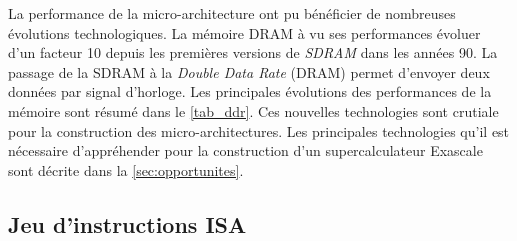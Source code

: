 La performance de la micro-architecture ont pu bénéficier de nombreuses évolutions technologiques.
La mémoire DRAM à vu ses performances évoluer d'un facteur 10 depuis les premières versions de \textit{SDRAM} dans les années 90. La passage de la SDRAM à la \textit{Double Data Rate} (DRAM) permet d'envoyer deux données par signal d'horloge. Les principales évolutions des performances de la mémoire sont résumé dans le \autoref{tab_ddr}. Ces nouvelles technologies sont crutiale pour la construction des micro-architectures. Les principales technologies qu'il est nécessaire d'appréhender pour la construction d'un supercalculateur Exascale sont décrite dans la \autoref{sec:opportunites}. 

\begin{table}[]
\centering
{}
\caption[Évolution des technologies de mémoire DRAM]{Les évolution des technologies mémoires DDR ont permis d'améliorer les vitesses de transferts d'un facteur dix en divisant par trois leur consommation électrique\protect\footnotemark}
\label{tab_ddr}
\end{table}












\subsection{Jeu d'instructions ISA } \label{sec:isa}


